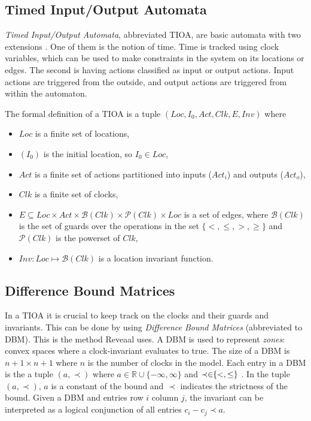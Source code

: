 \subsection{Timed Input/Output Automata}\label{sec:TIOA}
\commondisclaimer

\emph{Timed Input/Output Automata}, abbreviated TIOA, are basic automata with two extensions \cite{ecdartheory}. One of them is the notion of time. Time is tracked using clock variables, which can be used to make constraints in the system on its locations or edges. The second is having actions classified as input or output actions. Input actions are triggered from the outside, and output actions are triggered from within the automaton. 

The formal definition of a TIOA is a tuple \cite{ecdartheory} $(Loc, I_{0}, Act, Clk, E, Inv)$
where

\begin{itemize}
    \item $Loc$ is a finite set of locations,
    \item $(I_{0})$ is the initial location, so $I_{0} \in Loc$,
    \item $Act$ is a finite set of actions partitioned into inputs ($Act_{i}$) and outputs ($Act_{o}$),
    \item $Clk$ is a finite set of clocks,
    \item $E \subseteq Loc \times Act \times \mathcal{B}(Clk) \times \mathcal{P}(Clk) \times Loc$ is a set of edges, where $\mathcal{B}(Clk)$ is the set of guards over the operations in the set $\{<, \leq, >, \geq\}$ and $\mathcal{P}(Clk)$ is the powerset of $Clk$,
    \item $Inv : Loc \mapsto \mathcal{B}(Clk)$ is a location invariant function.
\end{itemize}

\subsection{Difference Bound Matrices}\label{sec:DBM}
In a TIOA it is crucial to keep track on the clocks and their guards and invariants. This can be done by using \emph{Difference Bound Matrices} (abbreviated to DBM). This is the method Reveaal uses.
A DBM is used to represent \emph{zones}: convex spaces where a clock-invariant evaluates to true. The size of a DBM is $n+1 \times n+1$ where $n$ is the number of clocks in the model.
Each entry in a DBM is the a tuple $(a, \prec)$ where $a \in \mathbb{R} \cup \{ -\infty, \infty \}$ and $\prec \in \hspace{-3pt} \{<, \leq\}$ \cite{peron:hal-00189821, Joost:DBM19}. In the tuple $(a, \prec)$, $a$ is a constant of the bound and $\prec$ indicates the strictness of the bound.
Given a DBM and entries row $i$ column $j$, the invariant can be interpreted as a logical conjunction of all entries $c_i - c_j \prec a$. 

